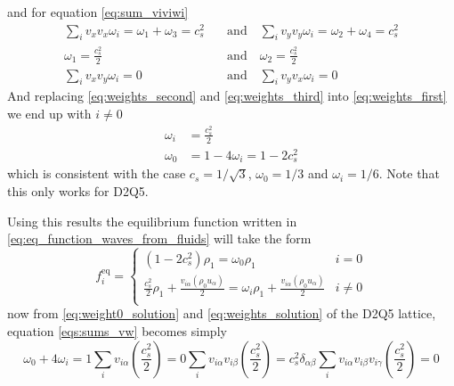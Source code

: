 and for equation \ref{eq:sum_viviwi} 
\begin{align}
    \sum_i v_{x}v_{x}\omega_i = \omega_1 + \omega_3 = c_s^2\quad&\text{and}\quad\sum_i v_{y}v_{y}\omega_i = \omega_2 + \omega_4 = c_s^2 \nonumber\\
    \omega_1 = \frac{c_s^2}{2}\quad&\text{and}\quad\omega_2 = \frac{c_s^2}{2} \nonumber\\
    \sum_i v_{x}v_{y}\omega_i = 0 \quad&\text{and}\quad\sum_i v_{y}v_{x}\omega_i = 0 \label{eq:weights_third}
\end{align}
And replacing \ref{eq:weights_second} and \ref{eq:weights_third} into \ref{eq:weights_first} we end up with $i\neq0$
\begin{align}
    \omega_i &= \frac{c_s^2}{2} \label{eq:weight0_solution}\\
    \omega_0 &= 1 - 4\omega_i = 1 - 2c_s^2\label{eq:weights_solution}
\end{align}
which is consistent with the case $c_s = 1/\sqrt{3}$, $\omega_0 = 1/3$ and $\omega_i = 1/6$. Note that this only works for D2Q5.

Using this results the equilibrium function written in \ref{eq:eq_function_waves_from_fluids} will take the form
\begin{equation}
    f_i^{\text{eq}} = \begin{cases}
        (1 - 2 c_s^2)\rho_1 = \omega_0\rho_1 & i=0 \\
        \frac{c_s^2}{2}\rho_1 + \frac{v_{i\alpha}(\rho_0 u_\alpha)}{2} = \omega_i\rho_1 + \frac{v_{i\alpha}(\rho_0 u_\alpha)}{2} & i\neq0 \\
    \end{cases} 
\end{equation}
now from \ref{eq:weight0_solution} and \ref{eq:weights_solution} of the D2Q5 lattice, equation \ref{eqs:sums_vw} becomes simply
\begin{subequations}\label{eqs:sums_vw}
\begin{equation}\label{eq:sum_wi_waves}
    \omega_0 + 4\omega_i = 1
\end{equation}
\begin{equation}\label{eq:sum_viwi_waves}
    \sum_i v_{i\alpha}\left(\frac{c_s^2}{2}\right) = 0
\end{equation}
\begin{equation}\label{eq:sum_viviwi_waves}
    \sum_i v_{i\alpha}v_{i\beta}\left(\frac{c_s^2}{2}\right) = c_s^2\delta_{\alpha\beta}
\end{equation}
\begin{equation}\label{eq:sum_viviviwi_waves}
    \sum_i v_{i\alpha}v_{i\beta}v_{i\gamma}\left(\frac{c_s^2}{2}\right) = 0
\end{equation}
\end{subequations}

